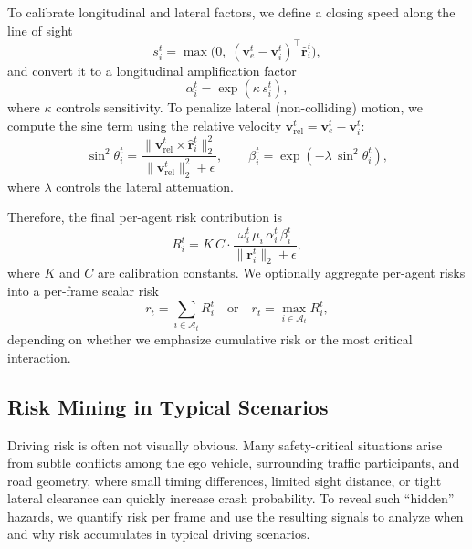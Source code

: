 \documentclass{article}
\begin{document}
To calibrate longitudinal and lateral factors, we define a closing speed along the line of sight
\begin{equation}
\label{eq:closing_speed}
s_i^t = \max\!\Big(0,\; (\mathbf{v}_e^t-\mathbf{v}_i^t)^\top \hat{\mathbf{r}}_i^t \Big),
\end{equation}
and convert it to a longitudinal amplification factor
\begin{equation}
\label{eq:long_factor}
\alpha_i^t = \exp(\kappa\, s_i^t),
\end{equation}
where $\kappa$ controls sensitivity.
To penalize lateral (non-colliding) motion, we compute the sine term using the relative velocity
$\mathbf{v}_{\mathrm{rel}}^t=\mathbf{v}_e^t-\mathbf{v}_i^t$:
\begin{equation}
\label{eq:lateral_sine}
\sin^2\theta_i^t =
\frac{\lVert \mathbf{v}_{\mathrm{rel}}^t \times \hat{\mathbf{r}}_i^t \rVert_2^2}
{\lVert \mathbf{v}_{\mathrm{rel}}^t \rVert_2^2 + \epsilon},
\qquad
\beta_i^t = \exp(-\lambda\, \sin^2\theta_i^t),
\end{equation}
where $\lambda$ controls the lateral attenuation.

Therefore, the final per-agent risk contribution is
\begin{equation}
\label{eq:agent_risk}
R_i^t = K\,C \cdot \frac{\omega_i^t\,\mu_i\,\alpha_i^t\,\beta_i^t}{\lVert \mathbf{r}_i^t \rVert_2 + \epsilon},
\end{equation}
where $K$ and $C$ are calibration constants.
We optionally aggregate per-agent risks into a per-frame scalar risk
\begin{equation}
\label{eq:frame_risk}
r_t = \sum_{i\in\mathcal{A}_t} R_i^t
\quad \text{or} \quad
r_t = \max_{i\in\mathcal{A}_t} R_i^t,
\end{equation}
depending on whether we emphasize cumulative risk or the most critical interaction.



\subsection{Risk Mining in Typical Scenarios}
\label{subsec:risk_mining}

Driving risk is often not visually obvious. Many safety-critical situations arise from subtle conflicts among the ego vehicle, surrounding traffic participants, and road geometry, where small timing differences, limited sight distance, or tight lateral clearance can quickly increase crash probability. To reveal such ``hidden'' hazards, we quantify risk per frame and use the resulting signals to analyze when and why risk accumulates in typical driving scenarios.
\end{document}
